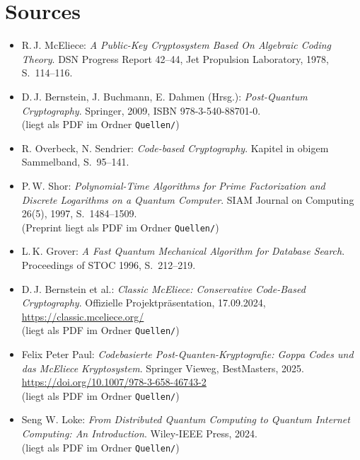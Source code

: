 \documentclass[a4paper,11pt]{article}
\begin{document}
\section{Sources}
\begin{itemize}
	\item R.\,J. McEliece: \emph{A Public-Key Cryptosystem Based On Algebraic
	      Coding Theory}. DSN Progress Report 42--44, Jet Propulsion Laboratory,
	      1978, S.~114--116.

	\item D.\,J. Bernstein, J. Buchmann, E. Dahmen (Hrsg.): \emph{Post-Quantum
	      Cryptography}. Springer, 2009, ISBN 978-3-540-88701-0. \\
	      (liegt als PDF im Ordner \texttt{Quellen/})

	\item R. Overbeck, N. Sendrier: \emph{Code-based Cryptography}. Kapitel in
	      obigem Sammelband, S.~95--141.

	\item P.\,W. Shor: \emph{Polynomial-Time Algorithms for Prime Factorization
	      and Discrete Logarithms on a Quantum Computer}. SIAM Journal on
	      Computing 26(5), 1997, S.~1484--1509. \\
	      (Preprint liegt als PDF im Ordner \texttt{Quellen/})

	\item L.\,K. Grover: \emph{A Fast Quantum Mechanical Algorithm for Database
	      Search}. Proceedings of STOC 1996, S.~212--219.

	\item D.\,J. Bernstein et al.: \emph{Classic McEliece: Conservative
	      Code-Based Cryptography}. Offizielle Projektpräsentation, 17.09.2024,
	      \url{https://classic.mceliece.org/} \\
	      (liegt als PDF im Ordner \texttt{Quellen/})

	\item Felix Peter Paul: \emph{Codebasierte Post-Quanten-Kryptografie: Goppa
	      Codes und das McEliece Kryptosystem}. Springer Vieweg, BestMasters,
	      2025. \url{https://doi.org/10.1007/978-3-658-46743-2} \\
	      (liegt als PDF im Ordner \texttt{Quellen/})

	\item Seng W. Loke: \emph{From Distributed Quantum Computing to Quantum
	      Internet Computing: An Introduction}. Wiley-IEEE Press, 2024. \\
	      (liegt als PDF im Ordner \texttt{Quellen/})


\end{itemize}
\end{document}
